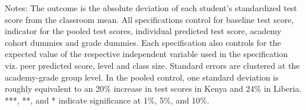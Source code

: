 \begin{center}
\begin{small}
\begin{threeparttable}
\begin{tablenotes}
\item Notes: The outcome is the absolute deviation of each student's standardized test score from the classroom mean. All specifications control for baseline test score, indicator for the pooled test scores, individual predicted test score, academy cohort dummies and grade dummies. Each specification also controls for the expected value of the respective independent variable used in the specification viz. peer predicted score, level and class size. Standard errors are clustered at the academy-grade group level. In the pooled control, one standard deviation is roughly equivalent to an 20\% increase in test scores in Kenya and 24\% in Liberia. ***, **, and * indicate significance at 1\%, 5\%, and 10\%.\end{tablenotes}
\end{threeparttable}
\end{small}
\end{center}
\clearpage
